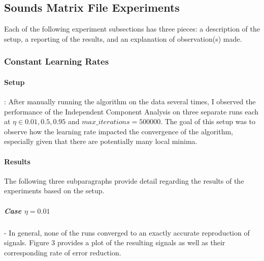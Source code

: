 \documentclass{article} %
\begin{document}
\subsection{Sounds Matrix File Experiments}

Each of the following experiment subsections has three pieces: a description of the setup, a reporting of the results, and an explanation of observation(s) made.

\subsubsection{Constant Learning Rates}

\paragraph{Setup}: After manually running the algorithm on the data several times, I observed the performance of the Independent Component Analysis on three separate runs each at \(\eta \in {0.01, 0.5, 0.95}\) and \(max\_iterations=500000\). The goal of this setup was to observe how the learning rate impacted the convergence of the algorithm, especially given that there are potentially many local minima.

\paragraph{Results} The following three subparagraphs provide detail regarding the results of the experiments based on the setup.
\subparagraph{\textit{Case \(\eta=0.01\)}}- In general, none of the runs converged to an exactly accurate reproduction of signals. Figure 3 provides a plot of the resulting signals as well as their corresponding rate of error reduction.
\end{document}
